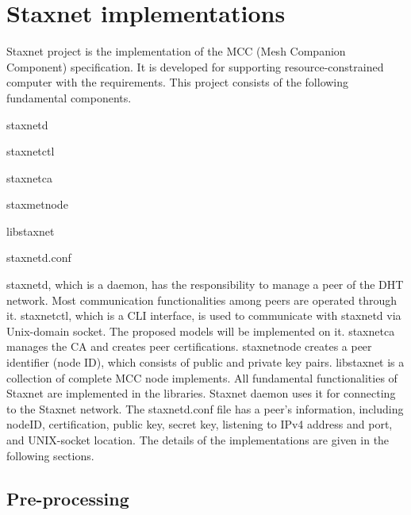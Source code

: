 \section{Staxnet implementations}

Staxnet project is the implementation of the MCC (Mesh Companion Component) specification. It is developed for supporting resource-constrained computer with the requirements. This project consists of the following fundamental components.

\begin{description}
	\item staxnetd
	\item staxnetctl
	\item staxnetca
	\item staxmetnode
	\item libstaxnet
	\item staxnetd.conf
\end{description}

staxnetd, which is a daemon, has the responsibility to manage a peer of the DHT network. Most communication functionalities among peers are operated through it. staxnetctl, which is a CLI interface, is used to communicate with staxnetd via Unix-domain socket. The proposed models will be implemented on it. staxnetca manages the CA and creates peer certifications. staxnetnode creates a peer identifier (node ID), which consists of public and private key pairs. libstaxnet is a collection of complete MCC node implements. All fundamental functionalities of Staxnet are implemented in the libraries. Staxnet daemon uses it for connecting to the Staxnet network. The staxnetd.conf file has a peer's information, including nodeID, certification, public key, secret key, listening to IPv4 address and port, and UNIX-socket location. The details of the implementations are given in the following sections.

\subsection{Pre-processing}

